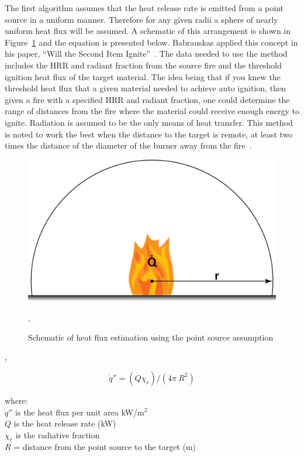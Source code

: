 \documentclass[twoside]{uocthesis}
\begin{document}
{The first algorithm assumes that the heat release rate is emitted from a point source in a uniform manner.  Therefore for any given radii a sphere of nearly uniform heat flux will be assumed. A schematic of this arrangement is shown in Figure~\ref{PointSourceHF} and the equation is presented below. Babrauskas applied this concept in his paper, ``Will the Second Item Ignite''~\cite{Babrauskas:1981}.  The data needed to use the method includes the HRR and radiant fraction from the source fire and the threshold ignition heat flux of the target material.  The idea being that if you knew the threshold heat flux that a given material needed to achieve auto ignition, then given a fire with a specified HRR and radiant fraction, one could determine the range of distances from the fire where the material could receive enough energy to ignite.  Radiation is assumed to be the only means of heat transfer.  This method is noted to work the best when the distance to the target is remote, at least two times the distance of the diameter of the burner away from the fire~\cite{Hamins:1991,Modak:1977}. 

\begin{figure}
	\centering
	\includegraphics[width=4.5in]{../Figures/PointSourceHF}
	\caption{Schematic of heat flux estimation using the point source assumption}
	\label{PointSourceHF},
\end{figure},

\begin{equation} \label{eq:second_item}
\dot{q}'' = (\dot{Q} \chi_r)/(4 \pi\ R^2)
\end{equation}

\begin{tabbing}
where: \=  \\
{}
\> $\dot{q}''$ is the heat flux per unit area kW/m$^2$\\
\> $\dot{Q}$ is the heat release rate (kW) \\ 
\> $\chi_r$ is the radiative fraction \\
\> $R$ = distance from the point source to the target (m) \\
\end{tabbing}

}
\end{document}
